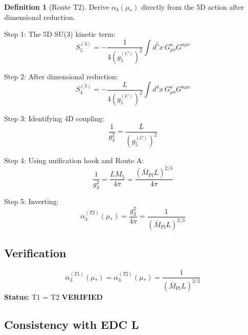 \documentclass[11pt,a4paper]{article}
\theoremstyle{definition}
\newtheorem{definition}{Definition}[section]
\begin{document}
\begin{definition}[Route T2]
Derive $\alpha_3(\mu_*)$ directly from the 5D action after dimensional reduction.
\end{definition}

Step 1: The 5D SU(3) kinetic term:
\begin{equation}
\label{eq:t2-step1}
S_5^{(3)} = -\frac{1}{4(g_5^{(C)})^2} \int d^5x \, G_{\mu\nu}^a G^{a\mu\nu}
\end{equation}

Step 2: After dimensional reduction:
\begin{equation}
\label{eq:t2-step2}
S_4^{(3)} = -\frac{L}{4(g_5^{(C)})^2} \int d^4x \, G_{\mu\nu}^a G^{a\mu\nu}
\end{equation}

Step 3: Identifying 4D coupling:
\begin{equation}
\label{eq:t2-step3}
\frac{1}{g_3^2} = \frac{L}{(g_5^{(C)})^2}
\end{equation}

Step 4: Using unification hook and Route A:
\begin{equation}
\label{eq:t2-step4}
\frac{1}{g_3^2} = \frac{L M_5}{4\pi} = \frac{(\bar{M}_{\text{Pl}} L)^{2/3}}{4\pi}
\end{equation}

Step 5: Inverting:
\begin{equation}
\label{eq:t2-step5}
\alpha_3^{(T2)}(\mu_*) = \frac{g_3^2}{4\pi} = \frac{1}{(\bar{M}_{\text{Pl}} L)^{2/3}}
\end{equation}

\subsection{Verification}
\label{subsec:verification}

\begin{predictionbox}
\begin{equation}
\label{eq:t1-equals-t2}
\boxed{\alpha_3^{(T1)}(\mu_*) = \alpha_3^{(T2)}(\mu_*) = \frac{1}{(\bar{M}_{\text{Pl}} L)^{2/3}}}
\end{equation}
\textbf{Status:} T1 = T2 \textbf{VERIFIED}
\end{predictionbox}

\subsection{Consistency with EDC L}
\label{subsec:consistency-edc}
\end{document}
